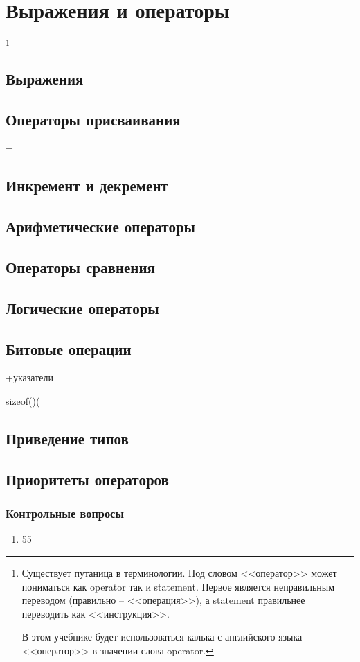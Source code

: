 \documentclass[myc.tex]{subfiles}
\begin{document}
\chapter{Выражения и операторы}
\label{ch:operators}

\footnote{Существует путаница в терминологии. Под словом <<оператор>> может пониматься как operator так и statement. Первое является неправильным переводом (правильно -- <<операция>>), а statement правильнее переводить как <<инструкция>>.

В этом учебнике будет использоваться калька с английского языка <<оператор>> в значении слова operator.}


\section{Выражения}

\section{Операторы присваивания}
=





\section{Инкремент и декремент}





\section{Арифметические операторы}



\section{Операторы сравнения}


\section{Логические операторы}


\section{Битовые операции}

+указатели

sizeof()(

\section{Приведение типов}

\section{Приоритеты операторов}




\subsection*{Контрольные вопросы}
\begin{enumerate}
\item 55
\end{enumerate}
\end{document}
